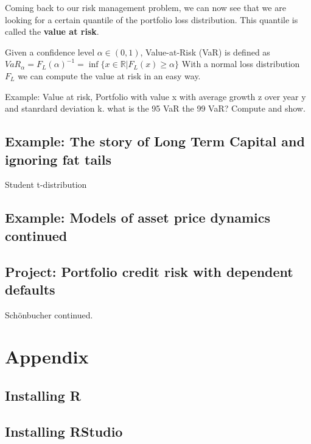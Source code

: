 \documentclass[
]{book}
\providecommand{\tightlist}{%
  \setlength{\itemsep}{0pt}\setlength{\parskip}{0pt}}
\begin{document}
Coming back to our risk management problem, we can now see that we are looking for a certain
quantile of the portfolio loss distribution. This quantile is called the \textbf{value at risk}.

\begin{description}
\tightlist
\item[Value-at-Risk]
Given a confidence level \(\alpha \in (0,1)\), Value-at-Risk (VaR) is defined as
\(VaR_\alpha = F_L(\alpha)^{-1} = \inf\{x \in \mathbb{R} | F_L(x) \geq \alpha \}\)
With a normal loss distribution \(F_L\) we can compute the value at risk
in an easy way.
\end{description}

Example: Value at risk, Portfolio with value x with average growth z over year y and stanrdard deviation k. what is the 95 VaR the 99 VaR? Compute and show.

\hypertarget{example-the-story-of-long-term-capital-and-ignoring-fat-tails}{%
\section{Example: The story of Long Term Capital and ignoring fat tails}\label{example-the-story-of-long-term-capital-and-ignoring-fat-tails}}

Student t-distribution

\hypertarget{example-models-of-asset-price-dynamics-continued}{%
\section{Example: Models of asset price dynamics continued}\label{example-models-of-asset-price-dynamics-continued}}

\hypertarget{project-portfolio-credit-risk-with-dependent-defaults}{%
\section{Project: Portfolio credit risk with dependent defaults}\label{project-portfolio-credit-risk-with-dependent-defaults}}

Schönbucher continued.

\hypertarget{appendix}{%
\chapter{Appendix}\label{appendix}}

\hypertarget{installing-r}{%
\section{Installing R}\label{installing-r}}

\hypertarget{installing-rstudio}{%
\section{Installing RStudio}\label{installing-rstudio}}

  
\end{document}
